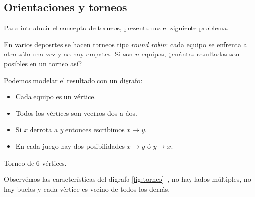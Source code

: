 \subsection{Orientaciones y torneos}

Para introducir el concepto de torneos, presentamos el siguiente problema:

\begin{prob}
    En varios deposrtes se hacen torneos tipo \textit{round robin}: cada equipo se enfrenta a otro sólo una vez y no hay empates. Si son $n$ equipos, ¿cuántos resultados son posibles en un torneo así?
    
    Podemos modelar el resultado con un digrafo:
    
    \begin{itemize}
        \item Cada equipo es un vértice.
        \item Todos los vértices son vecinos dos a dos.
        \item Si $x$ derrota a $y$ entonces escribimos $x \rightarrow y$.
        \item En cada juego hay dos posibilidades $x \rightarrow y$ ó $y \rightarrow x$.
    \end{itemize}
    
    \begin{marginfigure}
        \centering
        \caption{Torneo de 6 vértices.}
        \label{fig:torneo}
    \end{marginfigure}
    
    Observémos las características del digrafo \ref{fig:torneo}~, no hay lados múltiples, no hay bucles y cada vértice es vecino de todos los demás.
\end{prob}

